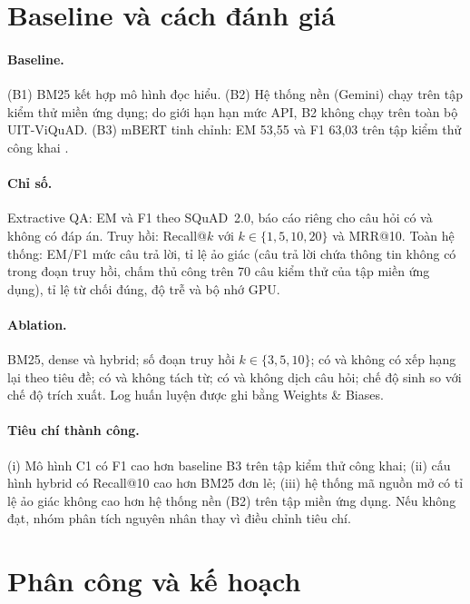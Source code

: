 \documentclass[11pt]{article}
\begin{document}
\section{Baseline và cách đánh giá}

\paragraph{Baseline.} (B1) BM25 kết hợp mô hình đọc hiểu. (B2) Hệ thống nền (Gemini) chạy trên tập kiểm thử miền ứng dụng; do giới hạn hạn mức API, B2 không chạy trên toàn bộ UIT-ViQuAD. (B3) mBERT tinh chỉnh: EM 53,55 và F1 63,03 trên tập kiểm thử công khai \citep{nguyen2022vimrc}.

\paragraph{Chỉ số.} Extractive QA: EM và F1 theo SQuAD~2.0, báo cáo riêng cho câu hỏi có và không có đáp án. Truy hồi: Recall@$k$ với $k \in \{1,5,10,20\}$ và MRR@10. Toàn hệ thống: EM/F1 mức câu trả lời, tỉ lệ ảo giác (câu trả lời chứa thông tin không có trong đoạn truy hồi, chấm thủ công trên 70 câu kiểm thử của tập miền ứng dụng), tỉ lệ từ chối đúng, độ trễ và bộ nhớ GPU.

\paragraph{Ablation.} BM25, dense và hybrid; số đoạn truy hồi $k \in \{3,5,10\}$; có và không có xếp hạng lại theo tiêu đề; có và không tách từ; có và không dịch câu hỏi; chế độ sinh so với chế độ trích xuất. Log huấn luyện được ghi bằng Weights \& Biases.

\paragraph{Tiêu chí thành công.} (i) Mô hình C1 có F1 cao hơn baseline B3 trên tập kiểm thử công khai; (ii) cấu hình hybrid có Recall@10 cao hơn BM25 đơn lẻ; (iii) hệ thống mã nguồn mở có tỉ lệ ảo giác không cao hơn hệ thống nền (B2) trên tập miền ứng dụng. Nếu không đạt, nhóm phân tích nguyên nhân thay vì điều chỉnh tiêu chí.

\section{Phân công và kế hoạch}
\end{document}
